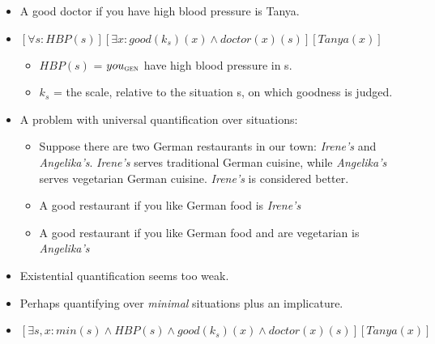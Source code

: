 \documentclass[letterpaper,12pt]{article}
\begin{document}
\begin{itemize}
  \item A good doctor if you have high blood pressure is Tanya.
  \item $[\forall s: HBP(s)][\exists x: good(k_s)(x) \wedge doctor(x)(s)][Tanya(x)]$
    \begin{itemize}
      \item $HBP(s)$ = $you_{\textsc{gen}}$ have high blood pressure in s.
      \item $k_s$ = the scale, relative to the situation s, on which goodness is judged. \parencite{kennedy2007vagueness}
    \end{itemize}
  \item A problem with universal quantification over situations:
    \begin{itemize}
      \item Suppose there are two German restaurants in our town: \textit{Irene's} and \textit{Angelika's}.
	\textit{Irene's} serves traditional German cuisine, while \textit{Angelika's} serves vegetarian German cuisine.
	\textit{Irene's} is considered better.
      \item A good restaurant if you like German food is \textit{Irene's}
      \item A good restaurant if you like German food and are vegetarian is \textit{Angelika's}
    \end{itemize}
  \item Existential quantification seems too weak.
  \item Perhaps quantifying over \textit{minimal} situations \parencite{elbourne2005situations} plus an implicature.
  \item $[\exists s,x: min(s) \wedge HBP(s) \wedge good(k_s)(x) \wedge doctor(x)(s)][Tanya(x)]$
\end{itemize}
\printbibliography
\end{document}
